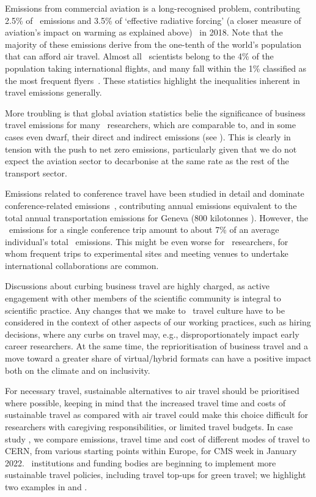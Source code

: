 \documentclass[../SustainableHEP.tex]{subfiles}
\begin{document}
Emissions from commercial aviation is a long-recognised problem, contributing 2.5\% of \CdO\ emissions and 3.5\% of ‘effective radiative forcing’ (a closer measure of aviation's impact on warming as explained above)~\cite{Rit20} in 2018.  Note that the majority of these emissions derive from the one-tenth of the world’s population that can afford air travel.  Almost all \ACR\ scientists belong to the 4\% of the population taking international flights, and many fall within the 1\% classified as the most frequent flyers~\cite{GOSSLING2020102194}.  These statistics highlight the inequalities inherent in travel emissions generally.

More troubling is that global aviation statistics belie the significance of business travel emissions for many \ACR\ researchers, which are comparable to, and in some cases even dwarf, their direct and indirect emissions (see ).  This is clearly in tension with the push to net zero emissions, particularly given that we do not expect the aviation sector to decarbonise at the same rate as the rest of the transport sector.

Emissions related to conference travel have been studied in detail and dominate conference-related emissions~\cite{Spinellis, nature_better_confs}, contributing annual emissions equivalent to the total annual transportation emissions for Geneva (800 kilotonnes \CdO).  However, the \CdO\ emissions for a single conference trip amount to about 7\% of an average individual’s total \CdO\ emissions. This might be even worse for \ACR\ researchers, for whom frequent trips to experimental sites and meeting venues to undertake international collaborations are common. 

Discussions about curbing business travel are highly charged, as active engagement with other members of the scientific community is integral to scientific practice. Any changes that we make to \ACR\ travel culture have to be considered in the context of other aspects of our working practices, such as hiring decisions, where any curbs on travel may, e.g., disproportionately impact early career researchers. At the same time, the reprioritisation of business travel and a move toward a greater share of virtual/hybrid formats can have a positive impact both on the climate and on inclusivity.

For necessary travel, sustainable alternatives to air travel should be prioritised where possible, keeping in mind that the increased travel time and costs of sustainable travel as compared with air travel could make this choice difficult for researchers with caregiving responsibilities, or limited travel budgets.  In case study , we compare emissions, travel time and cost of different modes of travel to CERN, from various starting points within Europe, for CMS week in January 2022.  \ACR\ institutions and funding bodies are beginning to implement more sustainable travel policies, including travel top-ups for green travel; we highlight two examples in  and .
\end{document}
